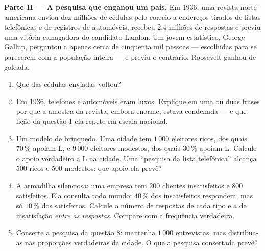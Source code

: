 \begin{problem}
\medskip
\noindent\textbf{Parte II --- A pesquisa que enganou um país.}
Em 1936, uma revista norte-americana enviou dez milhões de cédulas pelo
correio a endereços tirados de listas telefônicas e de registros de
automóveis, recebeu $2.4$ milhões de respostas e previu uma vitória
esmagadora do candidato Landon. Um jovem estatístico, George Gallup,
perguntou a apenas cerca de cinquenta mil pessoas --- escolhidas para
se parecerem com a população inteira --- e previu o contrário.
Roosevelt ganhou de goleada.
\begin{enumerate}[resume]
  \item Que  das cédulas enviadas voltou?
  \item Em 1936, telefones e automóveis eram luxos. Explique em uma ou
        duas frases por que a amostra da revista, embora enorme, estava
        condenada --- e que lição da questão 1 ela repete em escala
        nacional.
  \item Um modelo de brinquedo. Uma cidade tem $1\,000$ eleitores
        ricos, dos quais $70\,\%$ apoiam L, e $9\,000$ eleitores
        modestos, dos quais $30\,\%$ apoiam L. Calcule o apoio
        verdadeiro a L na cidade. Uma ``pesquisa da lista telefônica''
        alcança $500$ ricos e $500$ modestos: que apoio ela prevê?
  \item A armadilha silenciosa: uma empresa tem $200$ clientes
        insatisfeitos e $800$ satisfeitos. Ela consulta todo mundo;
        $40\,\%$ dos insatisfeitos respondem, mas só $10\,\%$ dos
        satisfeitos. Calcule o número de respostas de cada tipo e a
         de insatisfação \emph{entre as respostas}.
        Compare com a frequência verdadeira.
  \item Conserte a pesquisa da questão 8: mantenha $1\,000$ entrevistas,
        mas distribua-as nas proporções verdadeiras da cidade. O que a
        pesquisa consertada prevê?
\end{enumerate}


\end{problem}
